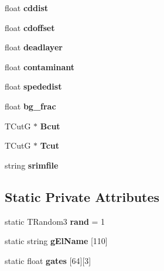 \begin{DoxyCompactItemize}
\mbox{\label{classdoppler_ab7b2d87bd7a05a73cc01c26d76e8cd93}} 
float {\bfseries cddist}
\item 
\mbox{\label{classdoppler_ade25af8752bc9c54cfb04a1c444f2be6}} 
float {\bfseries cdoffset}
\item 
\mbox{\label{classdoppler_a09bc0cdb38a83eaa1e9d1d3e34c6e5cc}} 
float {\bfseries deadlayer}
\item 
\mbox{\label{classdoppler_a9f50aca8788087aec33b5bbc17fcb136}} 
float {\bfseries contaminant}
\item 
\mbox{\label{classdoppler_a977ce490a70aa7f4db76a6e2315ca21c}} 
float {\bfseries spededist}
\item 
\mbox{\label{classdoppler_af3b8c866c2e7ede2d32769cbc758fa9d}} 
float {\bfseries bg\+\_\+frac}
\item 
\mbox{\label{classdoppler_ab9f46453da5b30a682c8858a5bb384e5}} 
T\+CutG $\ast$ {\bfseries Bcut}
\item 
\mbox{\label{classdoppler_a6c9da779ddf01933a0c9c75a48abc865}} 
T\+CutG $\ast$ {\bfseries Tcut}
\item 
\mbox{\label{classdoppler_ac178a2b7cfd79567a935438032c43c39}} 
string {\bfseries srimfile}
\end{DoxyCompactItemize}
\subsection*{Static Private Attributes}
\begin{DoxyCompactItemize}
\item 
\mbox{\label{classdoppler_aae9abccd585d661865d248898d74bbd2}} 
static T\+Random3 {\bfseries rand} = 1
\item 
\mbox{\label{classdoppler_a952dcea91ca4181a84b76d65ba20457d}} 
static string {\bfseries g\+El\+Name} \mbox{[}110\mbox{]}
\item 
\mbox{\label{classdoppler_a079fe638004583658e9d1ca6f5b92fc1}} 
static float {\bfseries gates} \mbox{[}64\mbox{]}\mbox{[}3\mbox{]}
\end{DoxyCompactItemize}


